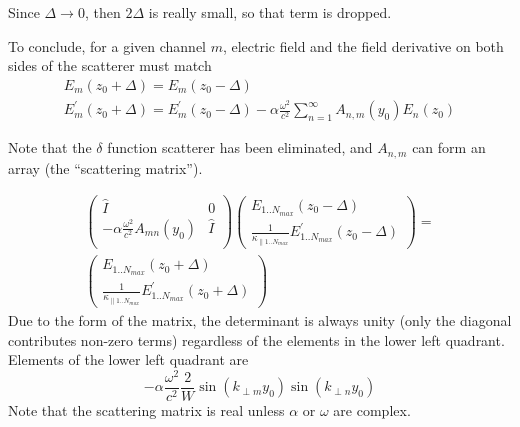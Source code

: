 Since $\Delta \rightarrow 0$, then $2 \Delta$ is really small, so that term is dropped.

To conclude, for a given channel $m$, electric field and the field derivative on both sides of the scatterer must match
\begin{equation}
\begin{gathered}
E_m(z_0+\Delta) = E_m(z_0-\Delta) \\
E_m^{\prime}(z_0+\Delta) = E_m^{\prime}(z_0-\Delta) - \alpha \frac{\omega^2}{c^2} \sum_{n=1}^\infty A_{n,m}(y_0) E_n(z_0)
\end{gathered}
\end{equation}

Note that the $\delta$ function scatterer has been eliminated, and $A_{n,m}$ can form an array (the ``scattering matrix'').

\begin{equation}
\begin{gathered}
\left( \begin{array}{cc}
\hat{I} & 0 \\
-\alpha \frac{\omega^2}{c^2}A_{mn}(y_0) & \hat{I} \\
\end{array} \right)
\left( \begin{array}{c}
E_{1..N_{max}}(z_0-\Delta) \\
\frac{1}{\kappa_{\parallel 1..N_{max}}} E_{1..N_{max}}^{\prime}(z_0-\Delta) 
\end{array} \right)
=\\
\left( \begin{array}{c}
E_{1..N_{max}}(z_0+\Delta) \\
\frac{1}{\kappa_{\parallel 1..N_{max}}} E_{1..N_{max}}^{\prime}(z_0+\Delta) 
\end{array} \right)
\end{gathered}
\end{equation}
Due to the form of the matrix, the determinant is always unity (only the diagonal contributes non-zero terms) regardless of the elements in the lower left quadrant. Elements of the lower left quadrant are
\begin{equation}
 -\alpha \frac{\omega^2}{c^2} \frac{2}{W} \sin(k_{\perp m} y_0) \sin(k_{\perp n} y_0)
\end{equation}
Note that the scattering matrix is real unless $\alpha$ or $\omega$ are complex.

